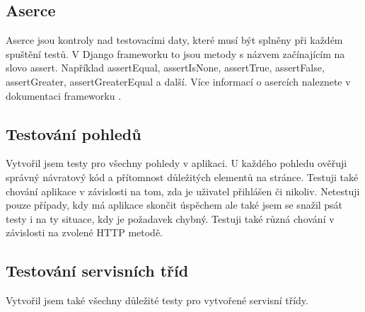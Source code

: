 \subsection{Aserce}
Aserce jsou kontroly nad testovacími daty, které musí být splněny při každém spuštění testů. V Django frameworku to jsou metody s názvem začínajícím na slovo assert. Například assertEqual, assertIsNone, assertTrue, assertFalse, assertGreater, assertGreaterEqual a další. Více informací o asercích naleznete v dokumentaci frameworku \cite{django-testing-tools}.

\subsection{Testování pohledů}
Vytvořil jsem testy pro všechny pohledy v aplikaci. U každého pohledu ověřuji správný návratový kód a přítomnost důležitých elementů na stránce. Testuji také chování aplikace v závislosti na tom, zda je uživatel přihlášen či nikoliv. Netestuji pouze případy, kdy má aplikace skončit úspěchem ale také jsem se snažil psát testy i na ty situace, kdy je požadavek chybný. Testuji také různá chování v závislosti na zvolené HTTP metodě.

\subsection{Testování servisních tříd}
Vytvořil jsem také všechny důležité testy pro vytvořené servisní třídy.
